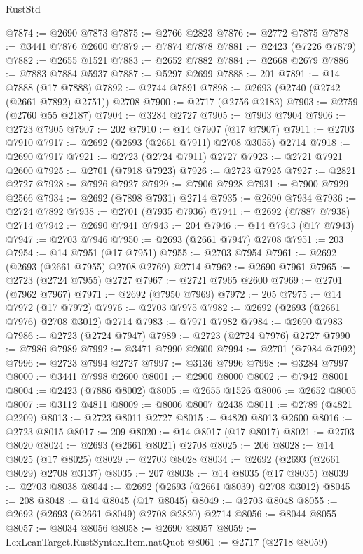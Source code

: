 \begin{lexlean}{RustStd}
\begin{coremodule}
@7874 := @2690 @7873
@7875 := @2766 @2823
@7876 := @2772 @7875
@7878 := @3441 @7876 @2600
@7879 := @7874 @7878
@7881 := @2423 (@7226 @7879)
@7882 := @2655 @1521
@7883 := @2652 @7882
@7884 := @2668 @2679
@7886 := @7883 @7884 @5937
@7887 := @5297 @2699
@7888 := 201
@7891 := @14 @7888 (@17 @7888)
@7892 := @2744 @7891
@7898 := @2693 (@2740 (@2742 (@2661 @7892) @2751)) @2708
@7900 := @2717 (@2756 @2183)
@7903 := @2759 (@2760 @55 @2187)
@7904 := @3284 @2727
@7905 := @7903 @7904
@7906 := @2723 @7905
@7907 := 202
@7910 := @14 @7907 (@17 @7907)
@7911 := @2703 @7910
@7917 := @2692 (@2693 (@2661 @7911) @2708 @3055) @2714
@7918 := @2690 @7917
@7921 := @2723 (@2724 @7911) @2727
@7923 := @2721 @7921 @2600
@7925 := @2701 (@7918 @7923)
@7926 := @2723 @7925
@7927 := @2821 @2727
@7928 := @7926 @7927
@7929 := @7906 @7928
@7931 := @7900 @7929 @2566
@7934 := @2692 (@7898 @7931) @2714
@7935 := @2690 @7934
@7936 := @2724 @7892
@7938 := @2701 (@7935 @7936)
@7941 := @2692 (@7887 @7938) @2714
@7942 := @2690 @7941
@7943 := 204
@7946 := @14 @7943 (@17 @7943)
@7947 := @2703 @7946
@7950 := @2693 (@2661 @7947) @2708
@7951 := 203
@7954 := @14 @7951 (@17 @7951)
@7955 := @2703 @7954
@7961 := @2692 (@2693 (@2661 @7955) @2708 @2769) @2714
@7962 := @2690 @7961
@7965 := @2723 (@2724 @7955) @2727
@7967 := @2721 @7965 @2600
@7969 := @2701 (@7962 @7967)
@7971 := @2692 (@7950 @7969)
@7972 := 205
@7975 := @14 @7972 (@17 @7972)
@7976 := @2703 @7975
@7982 := @2692 (@2693 (@2661 @7976) @2708 @3012) @2714
@7983 := @7971 @7982
@7984 := @2690 @7983
@7986 := @2723 (@2724 @7947)
@7989 := @2723 (@2724 @7976) @2727
@7990 := @7986 @7989
@7992 := @3471 @7990 @2600
@7994 := @2701 (@7984 @7992)
@7996 := @2723 @7994 @2727
@7997 := @3136 @7996
@7998 := @3284 @7997
@8000 := @3441 @7998 @2600
@8001 := @2900 @8000
@8002 := @7942 @8001
@8004 := @2423 (@7886 @8002)
@8005 := @2655 @1526
@8006 := @2652 @8005
@8007 := @3112 @4811
@8009 := @8006 @8007 @2438
@8011 := @2789 (@4821 @2209)
@8013 := @2723 @8011 @2727
@8015 := @4820 @8013 @2600
@8016 := @2723 @8015
@8017 := 209
@8020 := @14 @8017 (@17 @8017)
@8021 := @2703 @8020
@8024 := @2693 (@2661 @8021) @2708
@8025 := 206
@8028 := @14 @8025 (@17 @8025)
@8029 := @2703 @8028
@8034 := @2692 (@2693 (@2661 @8029) @2708 @3137)
@8035 := 207
@8038 := @14 @8035 (@17 @8035)
@8039 := @2703 @8038
@8044 := @2692 (@2693 (@2661 @8039) @2708 @3012)
@8045 := 208
@8048 := @14 @8045 (@17 @8045)
@8049 := @2703 @8048
@8055 := @2692 (@2693 (@2661 @8049) @2708 @2820) @2714
@8056 := @8044 @8055
@8057 := @8034 @8056
@8058 := @2690 @8057
@8059 := LexLeanTarget.RustSyntax.Item.natQuot
@8061 := @2717 (@2718 @8059)

\end{coremodule}
\end{lexlean}
